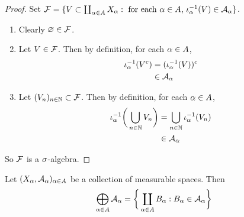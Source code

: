 \documentclass{book}
\begin{document}
	\begin{proof}
		Set $\mathcal{F} = \{V \subset \coprod_{\alpha \in A}  X_{\alpha}: \text{ for each $\alpha \in A$, $\iota_{\alpha}^{-1}(V) \in \mathcal{A}_{\alpha}$}\}$.
		\begin{enumerate}
			\item Clearly $\varnothing \in \mathcal{F}$.
			\item Let $V \in \mathcal{F}$. Then by definition, for each $\alpha \in A$,
			\begin{align*}
				\iota_{\alpha}^{-1}(V^c)
				& = ( \iota_{\alpha}^{-1}(V))^c \\
				& \in \mathcal{A}_{\alpha}
			\end{align*}
			\item Let $(V_n)_{n \in \mathbb{N}} \subset \mathcal{F}$. Then by definition, for each $\alpha \in A$,
			\begin{align*}
				\iota_{\alpha}^{-1}\bigg( \bigcup_{n \in \mathbb{N}} V_n \bigg)
				& = \bigcup_{n \in \mathbb{N}} \iota_{\alpha}^{-1}(V_n)\\
				& \in \mathcal{A}_{\alpha}
			\end{align*}
		\end{enumerate}
		So $\mathcal{F}$ is a $\sigma$-algebra.
	\end{proof}

	\begin{ex}
		Let $(X_{\alpha}, \mathcal{A}_{\alpha})_{\alpha \in A}$ be a collection of measurable spaces. Then 
		$$\bigoplus\limits_{\alpha \in A} \mathcal{A}_{\alpha} = \bigg \{\coprod_{\alpha \in A} B_{\alpha}: B_{\alpha} \in \mathcal{A}_{\alpha} \bigg\} $$
	\end{ex}
\end{document}
